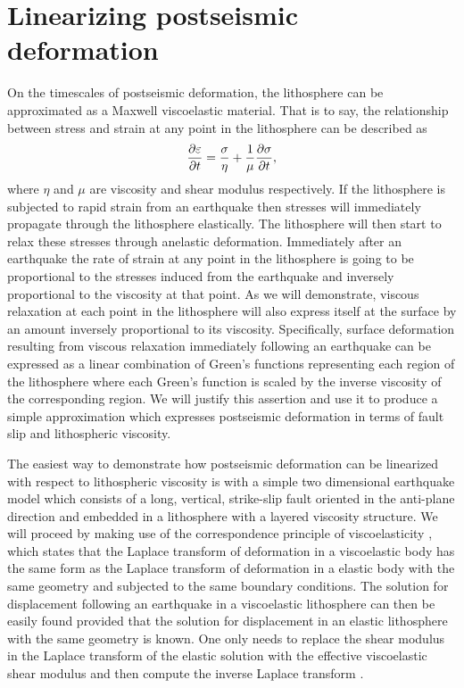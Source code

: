 \documentclass[12pt]{article}
\begin{document}
\section{Linearizing postseismic deformation} 
On the timescales of postseismic deformation, the lithosphere can be
approximated as a Maxwell viscoelastic material.  That is to say, the
relationship between stress and strain at any point in the lithosphere
can be described as
\begin{equation}
  \frac{\partial\bold{\varepsilon}}{\partial t}=\frac{\bold{\sigma}}{\eta} + 
                              \frac{1}{\mu}\frac{\partial\bold{\sigma}}{\partial t},
\end{equation}
where $\eta$ and $\mu$ are viscosity and shear modulus respectively.
If the lithosphere is subjected to rapid strain from an earthquake
then stresses will immediately propagate through the lithosphere
elastically.  The lithosphere will then start to relax these stresses
through anelastic deformation.  Immediately after an earthquake the rate
of strain at any point in the lithosphere is going to be proportional
to the stresses induced from the earthquake and inversely proportional
to the viscosity at that point.  As we will demonstrate, viscous
relaxation at each point in the lithosphere will also express itself
at the surface by an amount inversely proportional to its viscosity.
Specifically, surface deformation resulting from viscous relaxation
immediately following an earthquake can be expressed as a linear
combination of Green's functions representing each region of the
lithosphere where each Green's function is scaled by the inverse
viscosity of the corresponding region.  We will justify this assertion and
use it to produce a simple approximation which expresses postseismic
deformation in terms of fault slip and lithospheric viscosity.

The easiest way to demonstrate how postseismic deformation can be
linearized with respect to lithospheric viscosity is with a simple two
dimensional earthquake model which consists of a long, vertical,
strike-slip fault oriented in the anti-plane direction and embedded in
a lithosphere with a layered viscosity structure.  We will proceed by
making use of the correspondence principle of viscoelasticity
\citep{F1975}, which states that the Laplace transform of deformation
in a viscoelastic body has the same form as the Laplace transform of
deformation in a elastic body with the same geometry and subjected to
the same boundary conditions. The solution for displacement following
an earthquake in a viscoelastic lithosphere can then be easily found
provided that the solution for displacement in an elastic lithosphere
with the same geometry is known.  One only needs to replace the shear
modulus in the Laplace transform of the elastic solution with the
effective viscoelastic shear modulus and then compute the inverse
Laplace transform \citep[e.g.][]{HH2005,NM1974,SP1978}.
\end{document}
